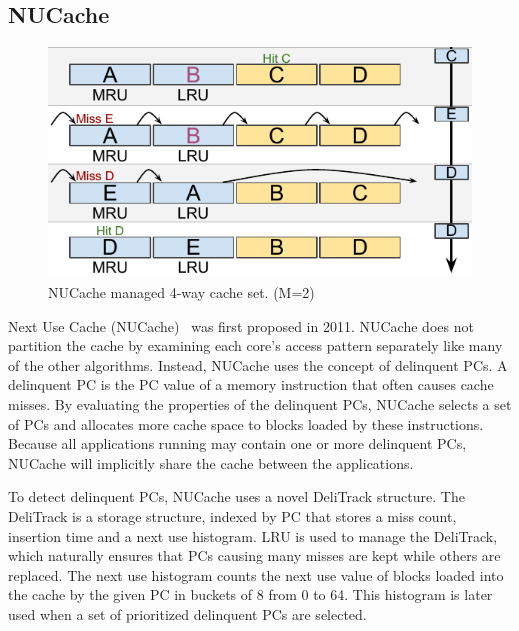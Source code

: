 
\subsection{NUCache}
\label{sec:algorithms:nucache}

\begin{figure}[ht]
    \centering
    \includegraphics[width=.65\textwidth]{figures/algorithms/NUCache}
    \caption[NUCache managed 4-way cache set.]{NUCache managed 4-way cache set. (M=2)}
    \label{fig:algorithms:nucache_example}
\end{figure}

Next Use Cache (NUCache)~\cite{Manikantan2011} was first proposed in 2011.
NUCache does not partition the cache by examining each core's access pattern separately like many of the other algorithms. 
Instead, NUCache uses the concept of delinquent PCs.
A delinquent PC is the PC value of a memory instruction that often causes cache misses.
By evaluating the properties of the delinquent PCs, NUCache selects a set of PCs and allocates more cache space to blocks loaded by these instructions.
Because all applications running may contain one or more delinquent PCs, NUCache will implicitly share the cache between the applications.

To detect delinquent PCs, NUCache uses a novel DeliTrack structure.
The DeliTrack is a storage structure, indexed by PC that stores a miss count, insertion time and a next use histogram. 
LRU is used to manage the DeliTrack, which naturally ensures that PCs causing many misses are kept while others are replaced.
The next use histogram counts the next use value of blocks loaded into the cache by the given PC in buckets of 8 from 0 to 64.
This histogram is later used when a set of prioritized delinquent PCs are selected.

